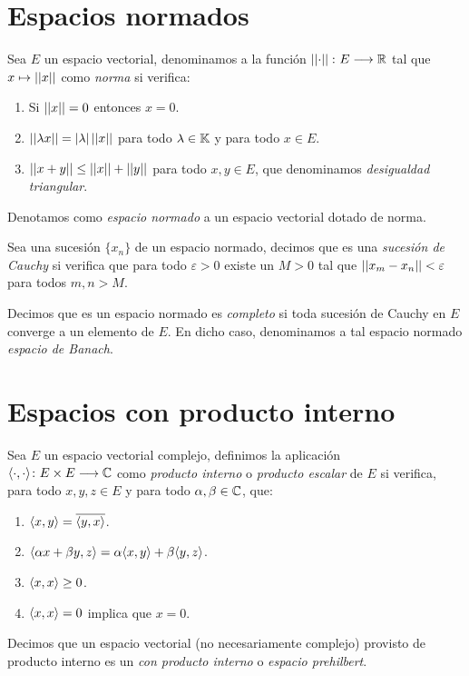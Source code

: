 \section{Espacios normados}

\begin{definition} \label{def:def23} Sea $E$ un espacio vectorial, denominamos a la función $\left|\left|\cdot\right|\right|\colon E\longrightarrow \mathbb{R}$ tal que $x\mapsto\left|\left|x\right|\right|$ como \textit{norma} si verifica:
\begin{enumerate}[label=\alph*)]
\item Si $\left|\left|x\right|\right|=0$ entonces $x=0$.
\item $\left|\left|\lambda x\right|\right|=|\lambda|\left|\left|x\right|\right|$ para todo $\lambda\in\mathbb{K}$ y para todo $x\in E$.
\item $\left|\left|x+y\right|\right|\leq \left|\left|x\right|\right| + \left|\left|y\right|\right|$ para todo $x,y\in E$, que denominamos \textit{desigualdad triangular}.
\end{enumerate}

Denotamos como \textit{espacio normado} a un espacio vectorial dotado de norma.
\end{definition}

\begin{definition} Sea una sucesión $\{x_n\}$ de un espacio normado, decimos que es una \textit{sucesión de Cauchy} si verifica que para todo $\varepsilon>0$ existe un $M>0$ tal que $\left|\left|x_m-x_n\right|\right|<\varepsilon$ para todos $m,n>M$.
\end{definition}

\begin{definition} Decimos que es un espacio normado es \textit{completo} si toda sucesión de Cauchy en $E$ converge a un elemento de $E$. En dicho caso, denominamos a tal espacio normado \textit{espacio de Banach}.
\end{definition}

\section{Espacios con producto interno}

\begin{definition} Sea $E$ un espacio vectorial complejo, definimos la aplicación \\$\langle\cdot,\cdot\rangle\colon E\times E\longrightarrow \mathbb{C}$ como \textit{producto interno} o \textit{producto escalar} de $E$ si verifica, para todo $x,y,z\in E$ y para todo $\alpha,\beta\in\mathbb{C}$, que:
\begin{enumerate}[label=\alph*)]
\item $\langle x,y\rangle=\overline{\langle y,x\rangle}$.
\item $\langle\alpha x + \beta y,z\rangle= \alpha \langle x,y\rangle + \beta \langle y,z\rangle$.
\item $\langle x,x\rangle\geq 0$.
\item $\langle x,x\rangle= 0$ implica que $x=0$.
\end{enumerate}

Decimos que un espacio vectorial (no necesariamente complejo) provisto de producto interno es un \textit{con producto interno} o \textit{espacio prehilbert}.
\end{definition}

